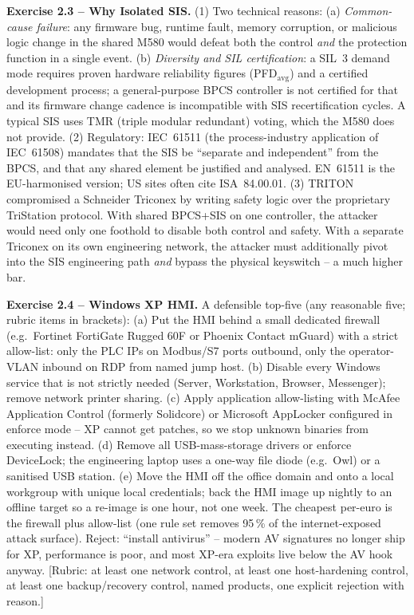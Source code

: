 \documentclass[11pt,a4paper]{article}
\begin{document}
\begin{solutionbox}
\textbf{Exercise 2.3 -- Why Isolated SIS.}
(1) Two technical reasons:
(a) \emph{Common-cause failure}: any firmware bug, runtime fault, memory
corruption, or malicious logic change in the shared M580 would defeat
both the control \emph{and} the protection function in a single event.
(b) \emph{Diversity and SIL certification}: a SIL~3 demand mode requires
proven hardware reliability figures (PFD$_\text{avg}$) and a certified
development process; a general-purpose BPCS controller is not certified
for that and its firmware change cadence is incompatible with SIS
recertification cycles. A typical SIS uses TMR (triple modular redundant)
voting, which the M580 does not provide.
(2) Regulatory: IEC~61511 (the process-industry application of IEC~61508)
mandates that the SIS be ``separate and independent'' from the BPCS, and
that any shared element be justified and analysed. EN~61511 is the
EU-harmonised version; US sites often cite ISA~84.00.01.
(3) TRITON compromised a Schneider Triconex by writing safety logic over
the proprietary TriStation protocol. With shared BPCS+SIS on one
controller, the attacker would need only one foothold to disable both
control and safety. With a separate Triconex on its own engineering
network, the attacker must additionally pivot into the SIS engineering
path \emph{and} bypass the physical keyswitch -- a much higher bar.
\end{solutionbox}

\begin{solutionbox}
\textbf{Exercise 2.4 -- Windows XP HMI.}
A defensible top-five (any reasonable five; rubric items in brackets):
(a) Put the HMI behind a small dedicated firewall (e.g.\ Fortinet
FortiGate Rugged 60F or Phoenix Contact mGuard) with a strict allow-list:
only the PLC IPs on Modbus/S7 ports outbound, only the operator-VLAN
inbound on RDP from named jump host. (b) Disable every Windows service
that is not strictly needed (Server, Workstation, Browser, Messenger);
remove network printer sharing. (c) Apply application allow-listing with
McAfee Application Control (formerly Solidcore) or Microsoft AppLocker
configured in enforce mode -- XP cannot get patches, so we stop unknown
binaries from executing instead. (d) Remove all USB-mass-storage drivers
or enforce DeviceLock; the engineering laptop uses a one-way file diode
(e.g.\ Owl) or a sanitised USB station. (e) Move the HMI off the office
domain and onto a local workgroup with unique local credentials; back the
HMI image up nightly to an offline target so a re-image is one hour, not
one week.
The cheapest per-euro is the firewall plus allow-list (one rule set
removes 95\,\% of the internet-exposed attack surface). Reject:
``install antivirus'' -- modern AV signatures no longer ship for XP,
performance is poor, and most XP-era exploits live below the AV
hook anyway.
[Rubric: at least one network control, at least one host-hardening
control, at least one backup/recovery control, named products, one
explicit rejection with reason.]
\end{solutionbox}
\end{document}
